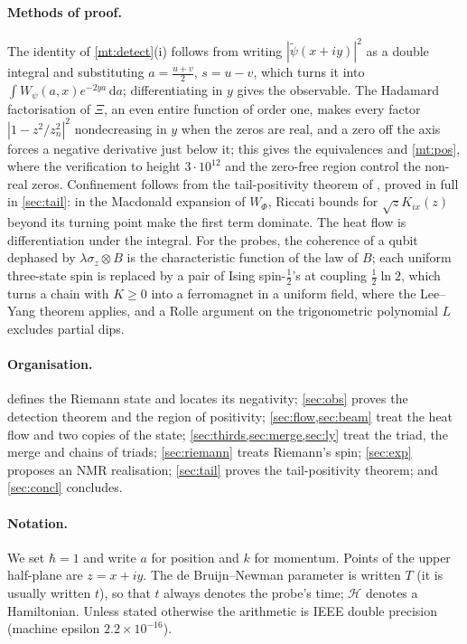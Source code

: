 \documentclass[11pt]{article}
\theoremstyle{definition}\newtheorem{definition}[theorem]{Definition}
\theoremstyle{remark}\newtheorem{remark}[theorem]{Remark}
\newcommand{\dd}{\,\mathrm d}\newcommand{\e}{\mathrm e}
\begin{document}
\paragraph{Methods of proof.} The identity of \cref{mt:detect}(i) follows from writing $|\tilde\psi(x+iy)|^2$ as a double integral and substituting $a=\frac{u+v}2$, $s=u-v$, which turns it into $\int W_\psi(a,x)e^{-2ya}\dd a$; differentiating in $y$ gives the observable. The Hadamard factorisation of $\Xi$, an even entire function of order one, makes every factor $|1-z^2/z_n^2|^2$ nondecreasing in $y$ when the zeros are real, and a zero off the axis forces a negative derivative just below it; this gives the equivalences and \cref{mt:pos}, where the verification to height $3\cdot10^{12}$ and the zero-free region control the non-real zeros. Confinement follows from the tail-positivity theorem of \cite{SMath}, proved in full in \cref{sec:tail}: in the Macdonald expansion of $W_\Phi$, Riccati bounds for $\sqrt zK_{ix}(z)$ beyond its turning point make the first term dominate. The heat flow is differentiation under the integral. For the probes, the coherence of a qubit dephased by $\lambda\sigma_z\otimes B$ is the characteristic function of the law of $B$; each uniform three-state spin is replaced by a pair of Ising spin-$\frac12$'s at coupling $\frac12\ln2$, which turns a chain with $K\ge0$ into a ferromagnet in a uniform field, where the Lee--Yang theorem applies, and a Rolle argument on the trigonometric polynomial $L$ excludes partial dips.

\paragraph{Organisation.}  defines the Riemann state and locates its negativity; \cref{sec:obs} proves the detection theorem and the region of positivity; \cref{sec:flow,sec:beam} treat the heat flow and two copies of the state; \cref{sec:thirds,sec:merge,sec:ly} treat the triad, the merge and chains of triads; \cref{sec:riemann} treats Riemann's spin; \cref{sec:exp} proposes an NMR realisation; \cref{sec:tail} proves the tail-positivity theorem; and \cref{sec:concl} concludes.

\paragraph{Notation.} We set $\hbar=1$ and write $a$ for position and $k$ for momentum. Points of the upper half-plane are $z=x+iy$. The de Bruijn--Newman parameter is written $T$ (it is usually written $t$), so that $t$ always denotes the probe's time; $\mathcal H$ denotes a Hamiltonian. Unless stated otherwise the arithmetic is IEEE double precision (machine epsilon $2.2\times10^{-16}$).
\end{document}
